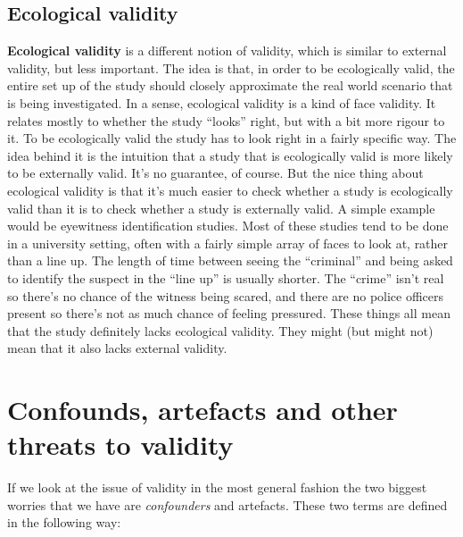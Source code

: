 \documentclass[
  letterpaper,
]{book}
\begin{document}
\hypertarget{ecological-validity}{%
\subsection{Ecological validity}\label{ecological-validity}}

\textbf{Ecological validity} is a different notion of validity, which is
similar to external validity, but less important. The idea is that, in
order to be ecologically valid, the entire set up of the study should
closely approximate the real world scenario that is being investigated.
In a sense, ecological validity is a kind of face validity. It relates
mostly to whether the study ``looks'' right, but with a bit more rigour
to it. To be ecologically valid the study has to look right in a fairly
specific way. The idea behind it is the intuition that a study that is
ecologically valid is more likely to be externally valid. It's no
guarantee, of course. But the nice thing about ecological validity is
that it's much easier to check whether a study is ecologically valid
than it is to check whether a study is externally valid. A simple
example would be eyewitness identification studies. Most of these
studies tend to be done in a university setting, often with a fairly
simple array of faces to look at, rather than a line up. The length of
time between seeing the ``criminal'' and being asked to identify the
suspect in the ``line up'' is usually shorter. The ``crime'' isn't real
so there's no chance of the witness being scared, and there are no
police officers present so there's not as much chance of feeling
pressured. These things all mean that the study definitely lacks
ecological validity. They might (but might not) mean that it also lacks
external validity.

\hypertarget{confounds-artefacts-and-other-threats-to-validity}{%
\section{Confounds, artefacts and other threats to
validity}\label{confounds-artefacts-and-other-threats-to-validity}}

If we look at the issue of validity in the most general fashion the two
biggest worries that we have are \emph{confounders} and artefacts. These
two terms are defined in the following way:
\end{document}
